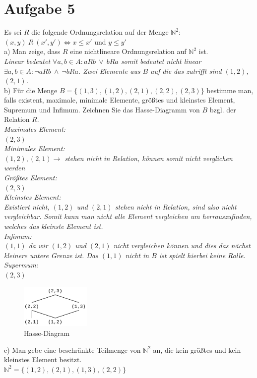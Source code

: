 \section*{Aufgabe 5}

Es sei $R$ die folgende Ordnungsrelation auf der Menge $\mathbb{N}^2$:\\
$(x,y) \ R \ (x',y') \Leftrightarrow x \leq x' \text{ und } y \leq y'$\\

a) Man zeige, dass $R$ eine nichtlineare Ordnungsrelation auf $\mathbb{N}^2$ ist.\\

\textit{Linear bedeutet $\forall a,b \in A : aRb \ \lor \ bRa$ somit bedeutet nicht linear $\exists a,b \in A : \lnot aRb \ \land \ \lnot bRa$. Zwei Elemente aus $B$ auf die das zutrifft sind $(1,2)$, $(2,1)$.}\\

b) Für die Menge $B = \{ (1, 3), (1, 2), (2, 1), (2, 2), (2, 3) \}$ bestimme man, falls existent, maximale, minimale Elemente, größtes und kleinstes Element, Supremum und Infimum. Zeichnen Sie das Hasse-Diagramm von $B$ bzgl. der Relation $R$.\\

\textit{Maximales Element:}\\
\textit{$(2,3)$}\\

\textit{Minimales Element:}\\
\textit{$(1,2), (2,1) \rightarrow$ stehen nicht in Relation, können somit nicht verglichen werden}\\

\textit{Größtes Element:}\\
$(2,3)$\\

\textit{Kleinstes Element:}\\
\textit{Existiert nicht, $(1,2)$ und $(2,1)$ stehen nicht in Relation, sind also nicht vergleichbar. Somit kann man nicht alle Element vergleichen um herrauszufinden, welches das kleinste Element ist.}\\

\textit{Infimum:}\\
\textit{$(1,1)$ da wir $(1,2)$ und $(2,1)$ nicht vergleichen können und dies das nächst kleinere untere Grenze ist. Das $(1,1)$ nicht in $B$ ist spielt hierbei keine Rolle.}\\

\textit{Supermum:}\\
$(2,3)$

\begin{figure}[h]
\centering
\includegraphics[width=0.3\textwidth]{graphics/hasse.png}
\caption{Hasse-Diagram}
\end{figure}

c) Man gebe eine beschränkte Teilmenge von $\mathbb{N}^2$ an, die kein größtes und kein kleinstes Element besitzt.\\

$\mathbb{N}^2 = \{ (1,2), (2,1), (1,3), (2,2) \}$